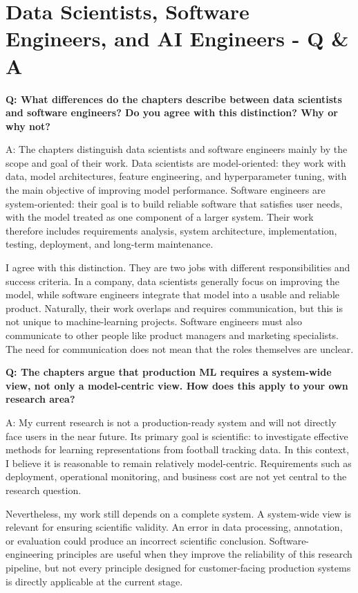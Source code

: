 \section{Data Scientists, Software Engineers, and AI Engineers - Q \& A}
\label{sec:qa}

\noindent\textbf{Q: What differences do the chapters describe between data scientists and software engineers? Do you agree with this distinction? Why or why not?}

A: 
The chapters distinguish data scientists and software engineers mainly by the scope and goal of their work. Data scientists are model-oriented: they work with data, model architectures, feature engineering, and hyperparameter tuning, with the main objective of improving model performance. Software engineers are system-oriented: their goal is to build reliable software that satisfies user needs, with the model treated as one component of a larger system. Their work therefore includes requirements analysis, system architecture, implementation, testing, deployment, and long-term maintenance.

I agree with this distinction. They are two jobs with different responsibilities and success criteria. In a company, data scientists generally focus on improving the model, while software engineers integrate that model into a usable and reliable product. Naturally, their work overlaps and requires communication, but this is not unique to machine-learning projects. Software engineers must also communicate to other people like product managers and marketing specialists. The need for communication does not mean that the roles themselves are unclear.


\noindent\textbf{Q: The chapters argue that production ML requires a system-wide view, not only a model-centric view. How does this apply to your own research area?}

A: 
My current research is not a production-ready system and will not directly face users in the near future. Its primary goal is scientific: to investigate effective methods for learning representations from football tracking data. In this context, I believe it is reasonable to remain relatively model-centric. Requirements such as deployment, operational monitoring, and business cost are not yet central to the research question.

Nevertheless, my work still depends on a complete system. A system-wide view is relevant for ensuring scientific validity. An error in data processing, annotation, or evaluation could produce an incorrect scientific conclusion. Software-engineering principles are useful when they improve the reliability of this research pipeline, but not every principle designed for customer-facing production systems is directly applicable at the current stage.


